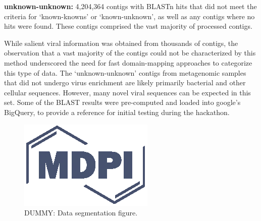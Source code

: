     \textbf{unknown-unknown:} 4,204,364 contigs with BLASTn hits that did not
    meet the criteria for ‘known-knowns’ or ‘known-unknown’, as well as any
    contigs where no hits were found. These contigs comprised the vast majority
    of processed contigs.

  While salient viral information was obtained from thousands of contigs, the
  observation that a vast majority of the contigs could not be characterized by
  this method underscored the need for fast domain-mapping approaches to
  categorize this type of data. The ‘unknown-unknown’ contigs from metagenomic
  samples that did not undergo virus enrichment are likely primarily bacterial
  and other cellular sequences. However, many novel viral sequences can be
  expected in this set. Some of the BLAST results were pre-computed and loaded
  into google's BigQuery, to provide a reference for initial testing during the
  hackathon.

  \begin{figure}[h]
    \centering
    \includegraphics{Definitions/logo-mdpi}
    \caption{DUMMY: Data segmentation figure.
            \label{fig:data_segmentation}}
  \end{figure}

